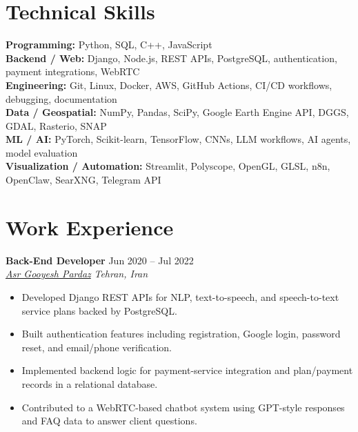 \documentclass[a4paper,10pt]{article}
\newcommand{\resumeSubheading}[4]{
    \textbf{#1} \hfill #2 \\
    \textit{#3} \hfill \textit{#4}
}
\begin{document}
\section*{Technical Skills}

\textbf{Programming:} Python, SQL, C++, JavaScript \\
\textbf{Backend / Web:} Django, Node.js, REST APIs, PostgreSQL, authentication, payment integrations, WebRTC \\
\textbf{Engineering:} Git, Linux, Docker, AWS, GitHub Actions, CI/CD workflows, debugging, documentation \\
\textbf{Data / Geospatial:} NumPy, Pandas, SciPy, Google Earth Engine API, DGGS, GDAL, Rasterio, SNAP \\
\textbf{ML / AI:} PyTorch, Scikit-learn, TensorFlow, CNNs, LLM workflows, AI agents, model evaluation \\
\textbf{Visualization / Automation:} Streamlit, Polyscope, OpenGL, GLSL, n8n, OpenClaw, SearXNG, Telegram API


\section*{Work Experience}

\resumeSubheading
{Back-End Developer}
{Jun 2020 -- Jul 2022}
{\href{https://asr-gooyesh.com/en/}{Asr Gooyesh Pardaz}}
{Tehran, Iran}
\begin{itemize}[leftmargin=0.25in]
    \item Developed Django REST APIs for NLP, text-to-speech, and speech-to-text service plans backed by PostgreSQL.
    \item Built authentication features including registration, Google login, password reset, and email/phone verification.
    \item Implemented backend logic for payment-service integration and plan/payment records in a relational database.
    \item Contributed to a WebRTC-based chatbot system using GPT-style responses and FAQ data to answer client questions.
\end{itemize}
\end{document}
